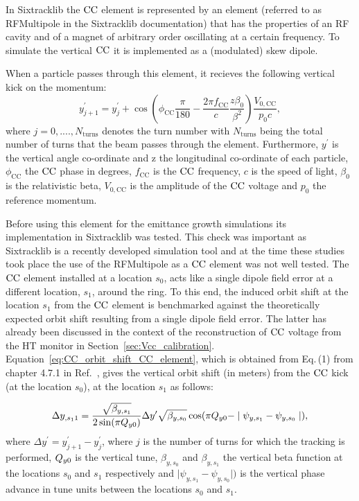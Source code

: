 In Sixtracklib the ${\mathrm{CC}}$ element is represented by an element (referred to as RFMultipole in the Sixtracklib documentation) that has the properties of an RF cavity and of a magnet of arbitrary order oscillating at a certain frequency. To simulate the vertical ${\mathrm{CC}}$ it is implemented as a (modulated) skew dipole.

When a particle passes through this element, it recieves the following vertical kick on the momentum:
\begin{equation}\label{eq:CC_kick_sixtracklib_vertical}
    y^\prime_{j+1} = y^\prime_{j} + \cos{\left ( \phi_\mathrm{CC} \frac{\pi}{180} - \frac{2\pi f_\mathrm{CC}}{c} \frac{z \beta_0}{\beta^2} \right )} \frac{V_\mathrm{0,CC}}{p_0 c},
\end{equation}
where $j={0, ...., N_\mathrm{turns}}$ denotes the turn number with $N_\mathrm{turns}$ being the total number of turns that the beam passes through the element. Furthermore, $y^\prime$ is the vertical angle co-ordinate and z the longitudinal co-ordinate of each particle, $\phi_\mathrm{CC}$ the ${\mathrm{CC}}$ phase in degrees, $f_\mathrm{CC}$ is the ${\mathrm{CC}}$ frequency, $c$ is the speed of light, $\beta_0$ is the relativistic beta, $V_\mathrm{0,CC}$ is the amplitude of the ${\mathrm{CC}}$ voltage and $p_0$ the reference momentum.


Before using this element for the emittance growth simulations its implementation in Sixtracklib was tested. This check was important as Sixtracklib is a recently developed simulation tool and at the time these studies took place the use of the RFMultipole as a ${\mathrm{CC}}$ element was not well tested. The ${\mathrm{CC}}$ element installed at a location $s_0$, acts like a single dipole field error at a different location, $s_1$, around the ring. To this end, the induced orbit shift at the location $s_1$ from the ${\mathrm{CC}}$ element is benchmarked against the theoretically expected orbit shift resulting from a single dipole field error. The latter has already been discussed in the context of the reconstruction of ${\mathrm{CC}}$ voltage from the HT monitor in Section~\ref{sec:Vcc_calibration}. Equation~\eqref{eq:CC_orbit_shift_CC_element}, which is obtained from Eq.\,(1) from chapter 4.7.1 in Ref.~\cite{Chao:1490001}, gives the vertical orbit shift (in meters) from the ${\mathrm{CC}}$ kick (at the location $s_0$), at the location $s_1$ as follows:

\begin{equation}\label{eq:CC_orbit_shift_CC_element}
    \Delta y_{,s_11} = \frac{\sqrt{\beta_{y, s_1}}}{2 \sin(\pi {Q_{y0}})} \Delta y^\prime \sqrt{\beta_{y, s_0}} \cos(\pi {Q_{y0}} - \mid \psi_{y, s_1} - \psi_{y, s_0} \mid),
 \end{equation}
where $\Delta y^\prime=y^\prime_{j+1}-y^\prime_{j}$, where $j$ is the number of turns for which the tracking is performed, ${Q_{y0}}$ is the vertical tune, $\beta_{y, s_0}$ and $\beta_{y, s_1}$ the vertical beta function at the locations $s_0$ and $s_1$ respectively and $\mid \psi_{y, s_1} - \psi_{y, s_0} \mid)$ is the vertical phase advance in tune units between the locations $s_0$ and $s_1$.

